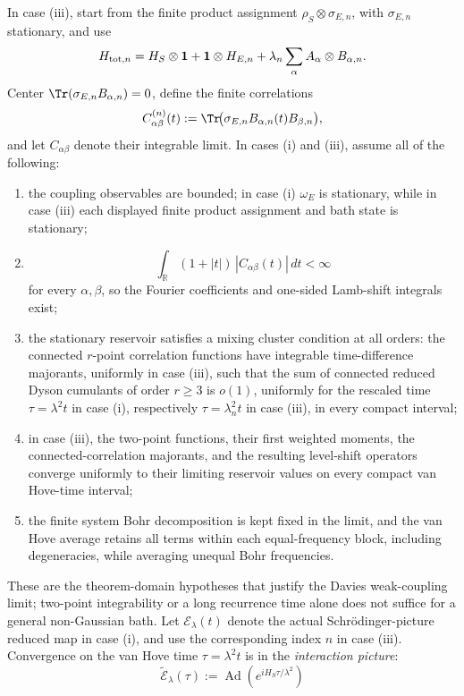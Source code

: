 \documentclass[12pt,a4paper]{article}
\begin{document}
\begin{theorem}
In case (iii), start from the finite product assignment
\(\rho_S\otimes\sigma_{E,n}\), with \(\sigma_{E,n}\) stationary, and use
\[
H_{{\rm tot},n}
=
H_S\otimes\mathbf 1+\mathbf 1\otimes H_{E,n}
+
\lambda_n\sum_\alpha A_\alpha\otimes B_{\alpha,n}.
\]
Center \(\Tr(\sigma_{E,n}B_{\alpha,n})=0\), define the finite correlations
\[
C^{(n)}_{\alpha\beta}(t)
:=
\Tr\!\bigl(\sigma_{E,n}B_{\alpha,n}(t)B_{\beta,n}\bigr),
\]
and let \(C_{\alpha\beta}\) denote their integrable limit.  In cases (i)
and (iii), assume all of the following:
\begin{enumerate}[label=(\alph*), leftmargin=2em]
\item the coupling observables are bounded; in case (i) \(\omega_E\) is
stationary, while in case (iii) each displayed finite product assignment
and bath state is stationary;
\item
\[
\int_{\mathbb R}(1+|t|)\,
|C_{\alpha\beta}(t)|\,dt<\infty
\]
for every \(\alpha,\beta\), so the Fourier coefficients and one-sided
Lamb-shift integrals exist;
\item the stationary reservoir satisfies a mixing cluster condition at all
orders: the connected \(r\)-point correlation functions have integrable
time-difference majorants, uniformly in case (iii), such that the sum of
connected reduced Dyson cumulants of order \(r\ge3\) is \(o(1)\), uniformly
for the rescaled time \(\tau=\lambda^2t\) in case (i), respectively
\(\tau=\lambda_n^2t\) in case (iii), in every compact interval;
\item in case (iii), the two-point functions, their first weighted moments,
the connected-correlation majorants, and the resulting level-shift operators
converge uniformly to their limiting reservoir values on every compact
van Hove-time interval;
\item the finite system Bohr decomposition is kept fixed in the limit, and
the van Hove average retains all terms within each equal-frequency block,
including degeneracies, while averaging unequal Bohr frequencies.
\end{enumerate}
These are the theorem-domain hypotheses that justify the Davies
weak-coupling limit; two-point integrability or a long recurrence time alone
does not suffice for a general non-Gaussian bath.  Let
\(\mathcal E_\lambda(t)\) denote the actual Schr\"odinger-picture reduced
map in case (i), and use the corresponding index \(n\) in case (iii).
Convergence on the van Hove time \(\tau=\lambda^2t\) is in the
\emph{interaction picture}:
\[
 \widetilde{\mathcal E}_\lambda(\tau)
 :=\operatorname{Ad}(e^{iH_S\tau/\lambda^2})
\]
\end{theorem}
\end{document}
